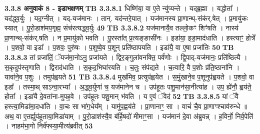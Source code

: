 \documentclass[17pt]{extarticle}
\begin{document}
{{{{{{{{{{{{{{{{{{{                \textbf{ 3.3.8     अनुवाकं   8 - इडाभक्षणम्} \newline
                                \textbf{ TB 3.3.8.1} \newline
                  धिष्णि॑या॒ वा ए॒ते न्यु॑प्यन्ते । यद्ब्र॒ह्मा । यद्धोता᳚ । यद॑द्ध्व॒र्युः । यद॒ग्नीत् । यद्-यज॑मानः । तान्. यद॑न्तरे॒यात् । यज॑मानस्य प्रा॒णान्थ्-संक॑र्.षेत् । प्र॒मायु॑कः स्यात् । पु॒रो॒डाश॑मप॒गृह्य॒ संच॑रत्यद्ध्व॒र्युः \textbf{ 49} \newline
                  \newline
                                \textbf{ TB 3.3.8.2} \newline
                  यज॑मानायै॒व तल्लो॒कꣳ शिꣳ॑षति । नास्य॑ प्रा॒णान्थ्-संक॑र्.षति । न प्र॒मायु॑को भवति । पु॒रस्ता᳚त् प्र॒त्यङ्ङासी॑नः । इडा॑या॒ इडा॒माद॑धाति । हस्त्याꣳ॒॒ होत्रे᳚ । प॒शवो॒ वा इडा᳚ । प॒शवः॒ पुरु॑षः । प॒शुष्वे॒व प॒शून् प्रति॑ष्ठापयति । इडा॑यै॒ वा ए॒षा प्रजा॑तिः \textbf{ 50} \newline
                  \newline
                                \textbf{ TB 3.3.8.3} \newline
                  तां प्रजा॑तिं॒ ॅयज॑मा॒नोऽनु॒ प्रजा॑यते । द्विर॒ङ्गुला॑वनक्ति॒ पर्व॑णोः । द्वि॒पाद्-यज॑मानः॒ प्रति॑ष्ठित्यै । स॒कृदुप॑स्तृणाति । द्विराद॑धाति । स॒कृद॒भिघा॑रयति । च॒तुः संप॑द्यते । च॒त्वारि॒ वै प॒शोः प्र॑ति॒ष्ठाना॑नि । यावा॑ने॒व प॒शुः । तमुप॑ह्वयते \textbf{ 51} \newline
                  \newline
                                \textbf{ TB 3.3.8.4} \newline
                  मुख॑मिव॒ प्रत्युप॑ह्वयेत । स॒मुं॒खाने॒व प॒शूनुप॑ह्वयते । प॒शवो॒ वा इडा᳚ । तस्मा॒थ् साऽन्वा॒रभ्या᳚ । अ॒द्ध्व॒र्युणा॑ च॒ यज॑मानेन च । उप॑हूतः पशु॒मान॑सा॒नीत्या॑ह । उप॒ ह्ये॑नौ॒ ह्वय॑ते॒ होता᳚ । इडा॑यै दे॒वता॑ना-मुपह॒वे । उप॑हूतः पशु॒मान् भ॑वति । य ए॒वं ॅवेद॑ \textbf{ 52} \newline
                  \newline
                                \textbf{ TB 3.3.8.5} \newline
                  यां ॅवै हस्त्या॒मिडा॑मा॒दधा॑ति । वा॒चः सा भा॑ग॒धेय᳚म् । यामु॑प॒ह्वय॑ते । प्रा॒णानाꣳ॒॒ सा । वाचं॑ चै॒व प्रा॒णाꣳश्चाव॑रुन्धे ॥ अथ॒ वा ए॒तर्ह्युप॑हूताया॒मिडा॑याम् । पु॒रो॒डाश॑स्यै॒व ब॑र्हि॒षदो॑ मीमाꣳ॒॒सा । यज॑मानं दे॒वा अ॑ब्रुवन्न् । ह॒विर्नो॒ निर्व॒पेति॑ । नाहम॑भा॒गो निर्व॑फ्स्या॒मीत्य॑ब्रवीत् \textbf{ 53} \newline
                  \newline
}}}}}}}}}}}}}}}}}}}
\end{document}

